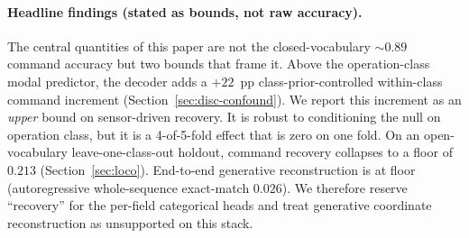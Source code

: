 \documentclass[sensors,article,submit,moreauthors,pdftex]{Definitions/mdpi}
\begin{document}
\paragraph{Headline findings (stated as bounds, not raw accuracy).} The central quantities of this paper are not the closed-vocabulary $\sim\!0.89$ command accuracy but two bounds that frame it. Above the operation-class modal predictor, the decoder adds a $+22$~pp class-prior-controlled within-class command increment (Section~\ref{sec:disc-confound}). We report this increment as an \emph{upper} bound on sensor-driven recovery. It is robust to conditioning the null on operation class, but it is a 4-of-5-fold effect that is zero on one fold. On an open-vocabulary leave-one-class-out holdout, command recovery collapses to a floor of $0.213$ (Section~\ref{sec:loco}). End-to-end generative reconstruction is at floor (autoregressive whole-sequence exact-match $0.026$). We therefore reserve ``recovery'' for the per-field categorical heads and treat generative coordinate reconstruction as unsupported on this stack.
\end{document}
